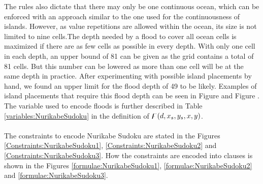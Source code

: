 The rules also dictate that there may only be one continuous ocean, which can be enforced with an approach similar to the one used for the continuousness of islands. However, as value repetitions are allowed within the ocean, its size is not limited to nine cells.The depth needed by a flood to cover all ocean cells is maximized if there are as few cells as possible in every depth. With only one cell in each depth, an upper bound of 81 can be given as the grid contains a total of 81 cells. But this number can be lowered as more than one cell will be at the same depth in practice. After experimenting with possible island placements by hand, we found an upper limit for the flood depth of 49 to be likely. Examples of island placements that require this flood depth can be seen in Figure  and Figure . The variable used to encode floods is further described in Table \ref{variables:NurikabeSudoku} in the definition of $\digamma(d,x_s,y_s,x,y)$.\\
\\
The constraints to encode Nurikabe Sudoku are stated in the Figures \ref{Constraints:NurikabeSudoku1}, \ref{Constraints:NurikabeSudoku2} and \ref{Constraints:NurikabeSudoku3}. How the constraints are encoded into clauses is shown in the Figures \ref{formulae:NurikabeSudoku1}, \ref{formulae:NurikabeSudoku2} and \ref{formulae:NurikabeSudoku3}.


